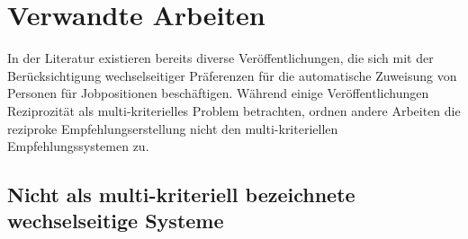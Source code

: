 
\chapter{Verwandte Arbeiten}
\label{ch:verwandte_arbeiten}
In der Literatur existieren bereits diverse Veröffentlichungen, die sich mit der Berücksichtigung wechselseitiger Präferenzen für die automatische Zuweisung von Personen für Jobpositionen beschäftigen.
Während einige Veröffentlichungen Reziprozität als multi-kriterielles Problem betrachten, ordnen andere Arbeiten die reziproke Empfehlungserstellung nicht den multi-kriteriellen Empfehlungssystemen zu.

\section{Nicht als multi-kriteriell bezeichnete wechselseitige Systeme}

